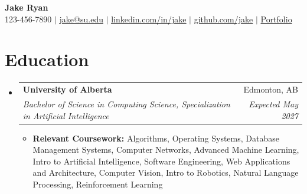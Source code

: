 \documentclass[letterpaper,11pt]{article}
\makeatletter
\newcommand{\resumeItem}[1]{
  \item\small{
    {#1 \vspace{-2pt}}
  }
}
\newcommand{\resumeSubheading}[4]{
  \vspace{-2pt}\item
    \begin{tabular*}{\textwidth}[t]{l@{\extracolsep{\fill}}r}
      \textbf{#1} & #2 \\
      \textit{\small#3} & \textit{\small #4} \\
    \end{tabular*}\vspace{-7pt}
}
\newcommand{\resumeProjectHeading}[2]{
    \item
    \begin{tabular*}{\textwidth}{l@{\extracolsep{\fill}}r}
      \small#1 & #2 \\
    \end{tabular*}\vspace{-7pt}
}
\newcommand{\resumePublicationItem}[4]{
    \vspace{-2pt}\item\small
    \href{#3}{#1}, \textit{#2, #4}\vspace{-2pt}
}
\newcommand{\resumeSubHeadingListStart}{\begin{itemize}[leftmargin=0.0in, label={}]}
\newcommand{\resumeSubHeadingListEnd}{\end{itemize}}
\newcommand{\resumeItemListStart}{\begin{itemize}[leftmargin=0.2in]}
\newcommand{\resumeItemListEnd}{\end{itemize}\vspace{-5pt}}
\makeatother
\begin{document}
\begin{center}
    \textbf{\Large Jake Ryan} \\ \vspace{1pt}
    \small 123-456-7890 $|$ \href{mailto:x@x.com}{\underline{jake@su.edu}} $|$
    \href{https://linkedin.com/in/...}{\underline{linkedin.com/in/jake}} $|$
    \href{https://github.com/...}{\underline{github.com/jake}} $|$
    \href{https://example.com/portfolio}{Portfolio}
\end{center}

%
%


\section{Education}
  \resumeSubHeadingListStart
    \resumeSubheading
      {University of Alberta}{Edmonton, AB}
      {Bachelor of Science in Computing Science, Specialization in Artificial Intelligence}{Expected May 2027}
      \resumeItemListStart
        \resumeItem{\textbf{Relevant Coursework:} Algorithms, Operating Systems, Database Management Systems, Computer Networks, Advanced Machine Learning, Intro to Artificial Intelligence, Software Engineering, Web Applications and Architecture, Computer Vision, Intro to Robotics, Natural Language Processing, Reinforcement Learning}
      \resumeItemListEnd
  \resumeSubHeadingListEnd
\end{document}
